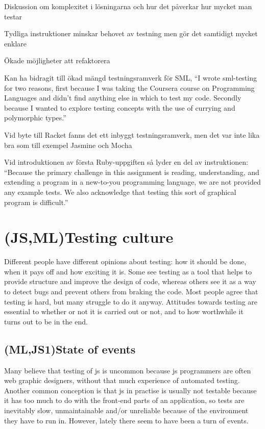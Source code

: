 \documentclass[11pt]{article}
\begin{document}
Diskussion om komplexitet i lösningarna och hur det påverkar hur mycket man testar

Tydliga instruktioner minskar behovet av testning men gör det samtidigt mycket enklare

Ökade möjligheter att refaktorera

Kan ha bidragit till ökad mängd testningsramverk för SML, ``I wrote sml-testing for two reasons, first because I was taking the Coursera course on Programming Languages and didn't find anything else in which to test my code. Secondly because I wanted to explore testing concepts with the use of currying and polymorphic types.''

Vid byte till Racket fanns det ett inbyggt testningsramverk, men det var inte lika bra som till exempel Jasmine och Mocha

Vid introduktionen av första Ruby-uppgiften så lyder en del av instruktionen: ``Because the primary challenge in this assignment is reading, understanding, and extending a program in a new-to-you programming language, we are not provided any example tests. We also acknowledge that testing this sort of graphical program is difficult.''


\section{(JS,ML)Testing culture}
\label{sec:testingculture}

Different people have different opinions about testing: how it should be done, when it pays off and how exciting it is. Some see testing as a tool that helps to provide structure and improve the design of code, whereas others see it as a way to detect bugs and prevent others from braking the code. Most people agree that testing is hard, but many struggle to do it anyway. Attitudes towards testing are essential to whether or not it is carried out or not, and to how worthwhile it turns out to be in the end.

\subsection{(ML,JS1)State of events}
\label{subsec:stateofevents}

Many believe that testing of \gls{js} is uncommon because \gls{js} programmers are often web graphic designers, without that much experience of automated testing. Another common conception is that \gls{js} in practise is usually not testable because it has too much to do with the front-end parts of an application, so tests are inevitably slow, unmaintainable and/or unreliable because of the environment they have to run in. However, lately there seem to have been a turn of events.
\end{document}
